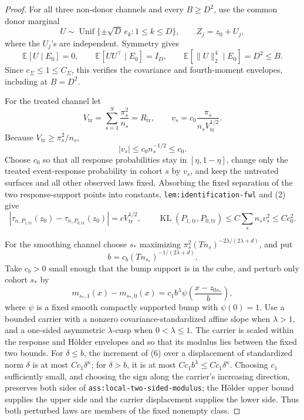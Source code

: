 \documentclass{article}
\begin{document}
\begin{proof}
For all three non-donor channels and every \(B\geq D^2\), use the common donor marginal
\[
U\sim\operatorname{Unif}\{\pm\sqrt D\,e_k:1\leq k\leq D\},
\qquad Z_j=z_0+U_j,
\]
where the \(U_j\)'s are independent.  Symmetry gives
\[
\mathbb E[U\mid E_0]=0,
\qquad
\mathbb E[UU^\top\mid E_0]=I_D,
\qquad
\mathbb E[\|U\|_2^4\mid E_0]=D^2\leq B.
\tag{4}
\]
Since \(c_\Sigma\leq1\leq C_\Sigma\), this verifies the covariance and fourth-moment envelopes, including at \(B=D^2\).

For the treated channel let
\[
V_{\mathrm{tr}}=\sum_{s=1}^{S}\frac{\pi_s^2}{n_s}=R_{\mathrm{tr}},
\qquad
v_s=c_0\frac{\pi_s}{n_sV_{\mathrm{tr}}^{1/2}}.
\]
Because \(V_{\mathrm{tr}}\geq\pi_s^2/n_s\),
\[
|v_s|\leq c_0n_s^{-1/2}\leq c_0.
\]
Choose \(c_0\) so that all response probabilities stay in \([\eta,1-\eta]\), change only the treated event-response probability in cohort \(s\) by \(v_s\), and keep the untreated surfaces and all other observed laws fixed.  Absorbing the fixed separation of the two response-support points into constants, \texttt{lem:identification-fwl} and (2) give
\[
\left|\tau_{n,P_{1,\mathrm{tr}}}(z_0)-
\tau_{n,P_{0,\mathrm{tr}}}(z_0)\right|
=cV_{\mathrm{tr}}^{1/2},
\qquad
\operatorname{KL}(P_{1,\mathrm{tr}},P_{0,\mathrm{tr}})
\leq C\sum_s n_sv_s^2\leq Cc_0^2.
\tag{5}
\]

For the smoothing channel choose \(s_*\) maximizing
\(\pi_s^2(Tn_s)^{-2\lambda/(2\lambda+d)}\), and put
\[
b=c_b(Tn_{s_*})^{-1/(2\lambda+d)}.
\]
Take \(c_b>0\) small enough that the bump support is in the cube, and perturb only cohort \(s_*\) by
\[
m_{s_*,1}(x)-m_{s_*,0}(x)
=c_1b^\lambda\psi\!\left(\frac{x-z_{0s_*}}b\right),
\tag{6}
\]
where \(\psi\) is a fixed smooth compactly supported bump with \(\psi(0)=1\).  Use a bounded carrier with a nonzero covariance-standardized affine slope when \(\lambda>1\), and a one-sided asymmetric \(\lambda\)-cusp when \(0<\lambda\leq1\).  The carrier is scaled within the response and H\"older envelopes and so that its modulus lies between the fixed two bounds.  For \(\delta\leq b\), the increment of (6) over a displacement of standardized norm \(\delta\) is at most \(Cc_1\delta^\kappa\); for \(\delta>b\), it is at most \(Cc_1b^\lambda\leq Cc_1\delta^\kappa\).  Choosing \(c_1\) sufficiently small, and choosing the sign along the carrier's increasing direction, preserves both sides of \texttt{ass:local-two-sided-modulus}; the H\"older upper bound supplies the upper side and the carrier displacement supplies the lower side.  Thus both perturbed laws are members of the fixed nonempty class.


\end{proof}
\end{document}
